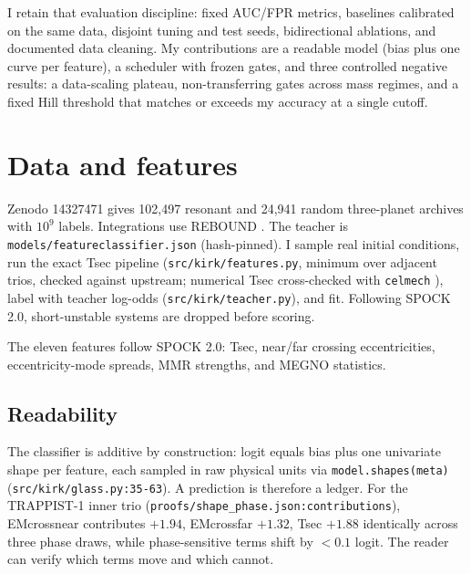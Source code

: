\documentclass[11pt]{article}
\begin{document}
I retain that evaluation discipline: fixed AUC/FPR metrics, baselines calibrated on the same data, disjoint tuning and test seeds, bidirectional ablations, and documented data cleaning. My contributions are a readable model (bias plus one curve per feature), a scheduler with frozen gates, and three controlled negative results: a data-scaling plateau, non-transferring gates across mass regimes, and a fixed Hill threshold that matches or exceeds my accuracy at a single cutoff.

\section{Data and features}
Zenodo 14327471 gives 102,497 resonant and 24,941 random three-planet archives with $10^9$ labels. Integrations use REBOUND \citep{Rein2017}. The teacher is \texttt{models/featureclassifier.json} (hash-pinned). I sample real initial conditions, run the exact Tsec pipeline (\texttt{src/kirk/features.py}, minimum over adjacent trios, checked against upstream; numerical Tsec cross-checked with \texttt{celmech} \citep{Hadden2022}), label with teacher log-odds (\texttt{src/kirk/teacher.py}), and fit. Following SPOCK 2.0, short-unstable systems are dropped before scoring.

The eleven features follow SPOCK 2.0: Tsec, near/far crossing eccentricities, eccentricity-mode spreads, MMR strengths, and MEGNO statistics.
\subsection{Readability}
The classifier is additive by construction: logit equals bias plus one univariate shape per feature, each sampled in raw physical units via \texttt{model.shapes(meta)} (\texttt{src/kirk/glass.py:35-63}). A prediction is therefore a ledger. For the TRAPPIST-1 inner trio (\texttt{proofs/shape\_phase.json:contributions}), EMcrossnear contributes $+1.94$, EMcrossfar $+1.32$, Tsec $+1.88$ identically across three phase draws, while phase-sensitive terms shift by $<0.1$ logit. The reader can verify which terms move and which cannot.
\end{document}
